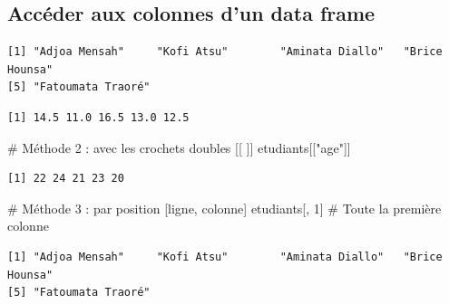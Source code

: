 \documentclass[
  french,
  11pt,
  a4paper,
]{article}
\newenvironment{Shaded}{}{}
\newcommand{\CommentTok}[1]{\textcolor[rgb]{0.42,0.45,0.49}{#1}}
\newcommand{\DecValTok}[1]{\textcolor[rgb]{0.00,0.36,0.77}{#1}}
\newcommand{\NormalTok}[1]{\textcolor[rgb]{0.14,0.16,0.18}{#1}}
\newcommand{\SpecialCharTok}[1]{\textcolor[rgb]{0.00,0.36,0.77}{#1}}
\newcommand{\StringTok}[1]{\textcolor[rgb]{0.01,0.18,0.38}{#1}}
\begin{document}
\subsection{Accéder aux colonnes d'un data
frame}\label{accuxe9der-aux-colonnes-dun-data-frame}

\begin{Shaded}
\end{Shaded}

\begin{verbatim}
[1] "Adjoa Mensah"     "Kofi Atsu"        "Aminata Diallo"   "Brice Hounsa"    
[5] "Fatoumata Traoré"
\end{verbatim}

\begin{Shaded}
\end{Shaded}

\begin{verbatim}
[1] 14.5 11.0 16.5 13.0 12.5
\end{verbatim}

\begin{Shaded}
\begin{Highlighting}[]
\CommentTok{\# Méthode 2 : avec les crochets doubles [[ ]]}
\NormalTok{etudiants[[}\StringTok{"age"}\NormalTok{]]}
\end{Highlighting}
\end{Shaded}

\begin{verbatim}
[1] 22 24 21 23 20
\end{verbatim}

\begin{Shaded}
\begin{Highlighting}[]
\CommentTok{\# Méthode 3 : par position [ligne, colonne]}
\NormalTok{etudiants[, }\DecValTok{1}\NormalTok{]   }\CommentTok{\# Toute la première colonne}
\end{Highlighting}
\end{Shaded}

\begin{verbatim}
[1] "Adjoa Mensah"     "Kofi Atsu"        "Aminata Diallo"   "Brice Hounsa"    
[5] "Fatoumata Traoré"
\end{verbatim}
\end{document}
